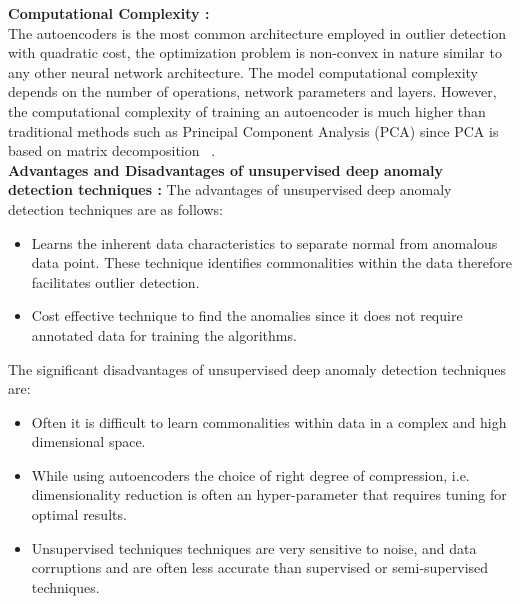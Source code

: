\textbf{Computational Complexity :} \\
The autoencoders is the most common architecture employed in outlier detection with quadratic cost, the optimization problem is non-convex in nature similar to any other neural network architecture.
The model computational complexity depends on the number of operations, network parameters and layers. However, the computational complexity of training an autoencoder is much higher than traditional methods such as Principal Component Analysis (PCA) since PCA is
based on matrix decomposition ~\cite{meng2018relational,parchami2017using}.\\
\textbf{Advantages and Disadvantages of unsupervised deep anomaly detection techniques :}
The advantages of unsupervised deep anomaly detection techniques are as follows:
\begin{itemize}
\item  Learns the inherent data characteristics to separate normal from anomalous data point. These technique  identifies commonalities within the data therefore facilitates outlier detection.
\item  Cost effective technique to find the anomalies since it does not require annotated data for training the algorithms.
\end{itemize}
The significant disadvantages of unsupervised deep anomaly detection techniques are:
\begin{itemize}
\item  Often it is difficult to learn commonalities within data in a complex and high dimensional space.
\item While using autoencoders the choice of right degree of compression, i.e. dimensionality reduction is often an hyper-parameter that requires tuning for optimal results.
\item Unsupervised techniques techniques are very sensitive to noise, and data corruptions and
       are often less accurate than supervised or semi-supervised techniques.
\end{itemize}








